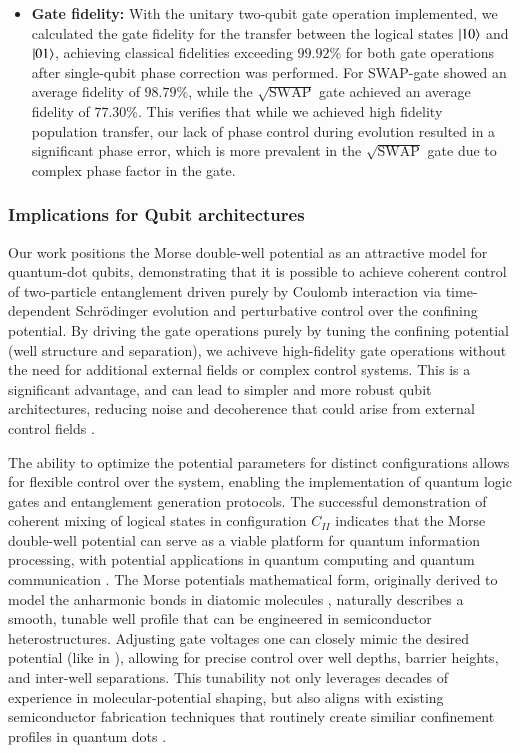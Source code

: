 \documentclass{subfiles}
\begin{document}
\begin{itemize}
    \item \textbf{Gate fidelity:} With the unitary two-qubit gate operation implemented, we calculated the gate fidelity for the transfer between the logical states $\ket{10}$ and $\ket{01}$, achieving classical fidelities exceeding $99.92\%$ for both gate operations after single-qubit phase correction was performed. For SWAP-gate showed an average fidelity of $98.79\%$, while the $\sqrt{\text{SWAP}}$ gate achieved an average fidelity of $77.30\%$. This verifies that while we achieved high fidelity population transfer, our lack of phase control during evolution resulted in a significant phase error, which is more prevalent in the $\sqrt{\text{SWAP}}$ gate due to complex phase factor in the gate.
\end{itemize}

\subsubsection*{Implications for Qubit architectures}
Our work positions the Morse double-well potential as an attractive model for quantum-dot qubits, demonstrating that it is possible to achieve coherent control of two-particle entanglement driven purely by Coulomb interaction via time-dependent Schrödinger evolution and perturbative control over the confining potential. By driving the gate operations purely by tuning the confining potential (well structure and separation), we achiveve high-fidelity gate operations without the need for additional external fields or complex control systems. This is a significant advantage, and can lead to simpler and more robust qubit architectures, reducing noise and decoherence that could arise from external control fields \cite{petta2005coherent, kuhlmann2013charge, yoneda2018quantum}.

The ability to optimize the potential parameters for distinct configurations allows for flexible control over the system, enabling the implementation of quantum logic gates and entanglement generation protocols. The successful demonstration of coherent mixing of logical states in configuration $C_{II}$ indicates that the Morse double-well potential can serve as a viable platform for quantum information processing, with potential applications in quantum computing and quantum communication \cite{nielsen2010quantum}. The Morse potentials mathematical form, originally derived to model the anharmonic bonds in diatomic molecules \cite{morse1929diatomic}, naturally describes a smooth, tunable well profile that can be engineered in semiconductor heterostructures. Adjusting gate voltages one can closely mimic the desired potential (like in \cite{leinonen2024coulomb}), allowing for precise control over well depths, barrier heights, and inter-well separations. This tunability not only leverages decades of experience in molecular-potential shaping, but also aligns with existing semiconductor fabrication techniques that routinely create similiar confinement profiles in quantum dots \cite{jacak2013quantum, garcia2021semiconductor}.
\end{document}
